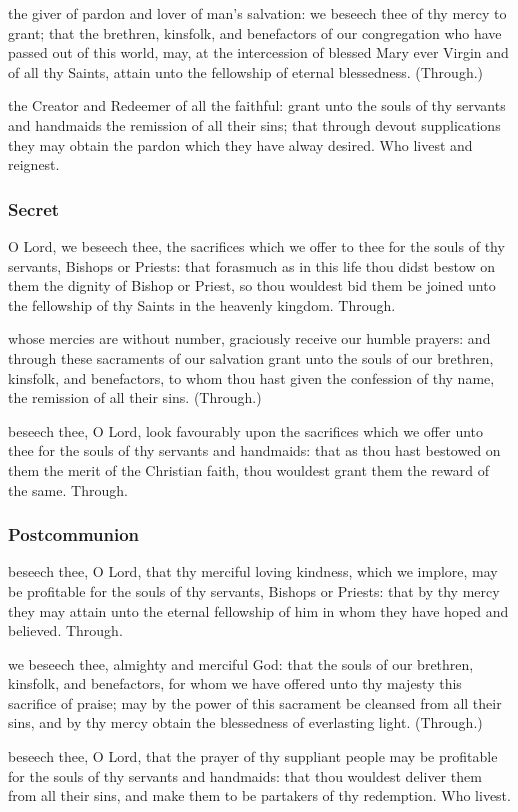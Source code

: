  the giver of pardon and lover of man's salvation: we beseech thee of thy mercy to grant; that the brethren, kinsfolk, and benefactors of our congregation who have passed out of this world, may, at the intercession of blessed Mary ever Virgin and of all thy Saints, attain unto the fellowship of eternal blessedness. (Through.)

 the Creator and Redeemer of all the faithful: grant unto the souls of thy servants and handmaids the remission of all their sins; that through devout supplications they may obtain the pardon which they have alway desired. Who livest and reignest.

\subsubsection{Secret}
 O Lord, we beseech thee, the sacrifices which we offer to thee for the souls of thy servants, Bishops or Priests: that forasmuch as in this life thou didst bestow on them the dignity of Bishop or Priest, so thou wouldest bid them be joined unto the fellowship of thy Saints in the heavenly kingdom. Through.

 whose mercies are without number, graciously receive our humble prayers: and through these sacraments of our salvation grant unto the souls of our brethren, kinsfolk, and benefactors, to whom thou hast given the confession of thy name, the remission of all their sins. (Through.)

 beseech thee, O Lord, look favourably upon the sacrifices which we offer unto thee for the souls of thy servants and handmaids: that as thou hast bestowed on them the merit of the Christian faith, thou wouldest grant them the reward of the same. Through.

\subsubsection{Postcommunion}
 beseech thee, O Lord, that thy merciful loving kindness, which we implore, may be profitable for the souls of thy servants, Bishops or Priests: that by thy mercy they may attain unto the eternal fellowship of him in whom they have hoped and believed. Through.

 we beseech thee, almighty and merciful God: that the souls of our brethren, kinsfolk, and benefactors, for whom we have offered unto thy majesty this sacrifice of praise; may by the power of this sacrament be cleansed from all their sins, and by thy mercy obtain the blessedness of everlasting light. (Through.)

 beseech thee, O Lord, that the prayer of thy suppliant people may be profitable for the souls of thy servants and handmaids: that thou wouldest deliver them from all their sins, and make them to be partakers of thy redemption. Who livest.